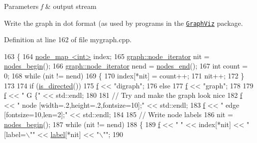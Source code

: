\begin{DoxyParams}{Parameters}
{\em f} & output stream\\
\hline
\end{DoxyParams}
Write the graph in dot format (as used by programs in the \href{http://www.research.att.com/sw/tools/graphviz/}{\tt Graph\+Viz} package. 

Definition at line 162 of file mygraph.\+cpp.


\begin{DoxyCode}
163 \{
164     \mbox{\hyperlink{classnode__map}{node\_map <int>}} index;
165     \mbox{\hyperlink{classgraph_a2cb374b84c133ce13f94e73c3e5da7fa}{graph::node\_iterator}} nit = \mbox{\hyperlink{classgraph_aec053a4b509d1be804237a80044c54c0}{nodes\_begin}}();
166     \mbox{\hyperlink{classgraph_a2cb374b84c133ce13f94e73c3e5da7fa}{graph::node\_iterator}} nend = \mbox{\hyperlink{classgraph_abbf9c0cb5629e98e1142254911238173}{nodes\_end}}();
167     \textcolor{keywordtype}{int} count = 0;
168     \textcolor{keywordflow}{while} (nit != nend)
169     \{
170         index[*nit] = count++;
171         nit++;
172     \}
173     
174     \textcolor{keywordflow}{if} (\mbox{\hyperlink{classgraph_afc510be7479fa903fde9e0e615470ab0}{is\_directed}}())
175         \mbox{\hyperlink{rings_8cpp_a77369fc4d5326a16d2c603e032023528}{f}} << \textcolor{stringliteral}{"digraph"};
176     \textcolor{keywordflow}{else}
177         \mbox{\hyperlink{rings_8cpp_a77369fc4d5326a16d2c603e032023528}{f}} << \textcolor{stringliteral}{"graph"};
178     
179     \mbox{\hyperlink{rings_8cpp_a77369fc4d5326a16d2c603e032023528}{f}} << \textcolor{stringliteral}{" G \{"} << std::endl;
180 
181     \textcolor{comment}{// Try and make the graph look nice}
182     \mbox{\hyperlink{rings_8cpp_a77369fc4d5326a16d2c603e032023528}{f}} << \textcolor{stringliteral}{"   node [width=.2,height=.2,fontsize=10];"} << std::endl;
183     \mbox{\hyperlink{rings_8cpp_a77369fc4d5326a16d2c603e032023528}{f}} << \textcolor{stringliteral}{"   edge [fontsize=10,len=2];"} << std::endl;
184     
185     \textcolor{comment}{// Write node labels}
186     nit = \mbox{\hyperlink{classgraph_aec053a4b509d1be804237a80044c54c0}{nodes\_begin}}();
187     \textcolor{keywordflow}{while} (nit != nend)
188     \{
189         \mbox{\hyperlink{rings_8cpp_a77369fc4d5326a16d2c603e032023528}{f}} << \textcolor{stringliteral}{"   "} << index[*nit] << \textcolor{stringliteral}{" [label=\(\backslash\)""} << \mbox{\hyperlink{class_my_graph_a5c9923e2b43cb5a3139715acc34b8ca8}{label}}[*nit] << \textcolor{stringliteral}{"\(\backslash\)""};
190         

\end{DoxyCode}
